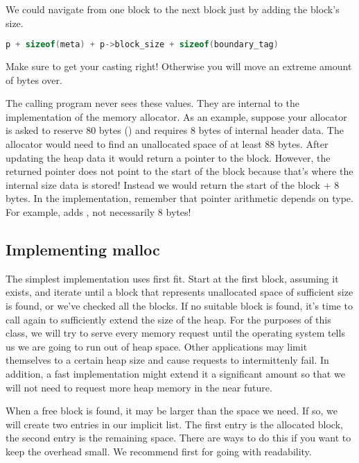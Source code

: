 We could navigate from one block to the next block just by adding the block's size.

\begin{lstlisting}[language=C]
p + sizeof(meta) + p->block_size + sizeof(boundary_tag)
\end{lstlisting}

Make sure to get your casting right!
Otherwise you will move an extreme amount of bytes over.

The calling program never sees these values.
They are internal to the implementation of the memory allocator.
As an example, suppose your allocator is asked to reserve 80 bytes () and requires 8 bytes of internal header data.
The allocator would need to find an unallocated space of at least 88 bytes.
After updating the heap data it would return a pointer to the block.
However, the returned pointer does not point to the start of the block because that's where the internal size data is stored!
Instead we would return the start of the block + 8 bytes.
In the implementation, remember that pointer arithmetic depends on type. For example,  adds , not necessarily 8 bytes!

\subsection{Implementing malloc}

The simplest implementation uses first fit.
Start at the first block, assuming it exists, and iterate until a block that represents unallocated space of sufficient size is found, or we've checked all the blocks.
If no suitable block is found, it's time to call  again to sufficiently extend the size of the heap.
For the purposes of this class, we will try to serve every memory request until the operating system tells us we are going to run out of heap space.
Other applications may limit themselves to a certain heap size and cause requests to intermittenly fail.
In addition, a fast implementation might extend it a significant amount so that we will not need to request more heap memory in the near future.

When a free block is found, it may be larger than the space we need.
If so, we will create two entries in our implicit list.
The first entry is the allocated block, the second entry is the remaining space.
There are ways to do this if you want to keep the overhead small.
We recommend first for going with readability.

